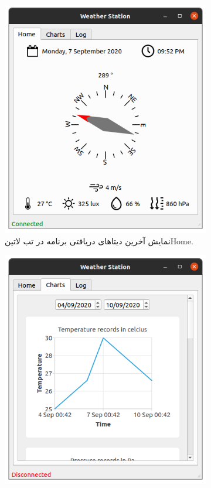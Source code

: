 \begin{figure}[!h]
	\begin{subfigure}[b]{0.5\textwidth}
		\includegraphics[width=\linewidth]{Assets/desktopAppHome.png}
		\caption{نمایش آخرین دیتاهای دریافتی برنامه در تب ‌لاتین{Home}.}
		\label{fig:desktopAppHome}
	\end{subfigure}
	\begin{subfigure}[b]{0.5\textwidth}
		\includegraphics[width=\linewidth]{Assets/desktopAppCharts.png}

\end{subfigure}
\end{figure}

